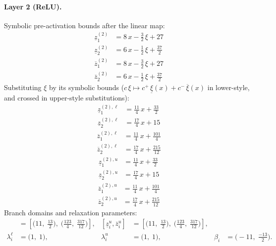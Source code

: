 \documentclass[11pt]{article}
\begin{document}
\paragraph{Layer 2 (ReLU).}
Symbolic pre-activation bounds after the linear map:
\begin{align*}
\underline{z}^{(2)}_{1} &= 8\,x - \frac{3}{2}\,\xi + 27 \\
\underline{z}^{(2)}_{2} &= 6\,x - \frac{1}{2}\,\xi + \frac{37}{2}
\end{align*}
\begin{align*}
\overline{z}^{(2)}_{1} &= 8\,x - \frac{3}{2}\,\xi + 27 \\
\overline{z}^{(2)}_{2} &= 6\,x - \frac{1}{2}\,\xi + \frac{37}{2}
\end{align*}
Substituting $\xi$ by its symbolic bounds ($c\,\xi \mapsto c^{+}\,\underline{\xi}(x) + c^{-}\,\overline{\xi}(x)$ in lower-style, and crossed in upper-style substitutions):
\begin{align*}
\underline{z}^{(2),\ell}_{1} &= \frac{11}{4}\,x + \frac{33}{2} \\
\underline{z}^{(2),\ell}_{2} &= \frac{17}{4}\,x + 15
\end{align*}
\begin{align*}
\overline{z}^{(2),\ell}_{1} &= \frac{11}{4}\,x + \frac{101}{4} \\
\overline{z}^{(2),\ell}_{2} &= \frac{17}{4}\,x + \frac{215}{12}
\end{align*}
\begin{align*}
\underline{z}^{(2),u}_{1} &= \frac{11}{4}\,x + \frac{33}{2} \\
\underline{z}^{(2),u}_{2} &= \frac{17}{4}\,x + 15
\end{align*}
\begin{align*}
\overline{z}^{(2),u}_{1} &= \frac{11}{4}\,x + \frac{101}{4} \\
\overline{z}^{(2),u}_{2} &= \frac{17}{4}\,x + \frac{215}{12}
\end{align*}
Branch domains and relaxation parameters:
\begin{align*}
[\underline{z}^{\ell}_i, \overline{z}^{\ell}_i] &= [\bigl(11,\; \frac{13}{2}\bigr),\; \bigl(\frac{123}{4},\; \frac{317}{12}\bigr)], & [\underline{z}^{u}_i, \overline{z}^{u}_i] &= [\bigl(11,\; \frac{13}{2}\bigr),\; \bigl(\frac{123}{4},\; \frac{317}{12}\bigr)], \\
\lambda^{\ell}_i &= \bigl(1,\; 1\bigr), & \lambda^{u}_i &= \bigl(1,\; 1\bigr), & \beta_i &= \bigl(-11,\; \frac{-13}{2}\bigr).
\end{align*}
\end{document}
